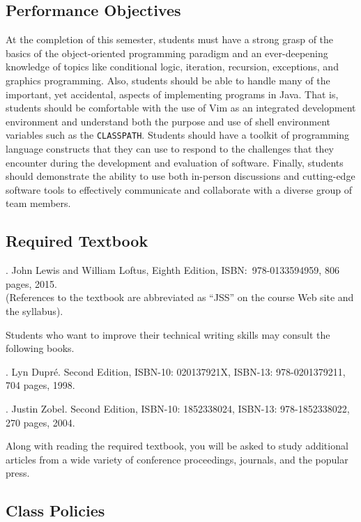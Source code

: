 \subsection*{Performance Objectives}

At the completion of this semester, students must have a strong grasp of the basics of the object-oriented programming
paradigm and an ever-deepening knowledge of topics like conditional logic, iteration, recursion, exceptions, and
graphics programming.  Also, students should be able to handle many of the important, yet accidental, aspects of
implementing programs in Java.  That is, students should be comfortable with the use of Vim as an integrated development
environment and understand both the purpose and use of shell environment variables such as the {\tt CLASSPATH}.
Students should have a toolkit of programming language constructs that they can use to respond to the challenges that
they encounter during the development and evaluation of software. Finally, students should demonstrate the ability to
use both in-person discussions and cutting-edge software tools to effectively communicate and collaborate with a diverse
group of team members.

\subsection*{Required Textbook}

. John Lewis and William Loftus,
Eighth Edition, ISBN:\ 978-0133594959, 806 pages, 2015. \\
(References to the textbook are abbreviated as ``JSS'' on the course Web site and the syllabus).

\noindent
Students who want to improve their technical writing skills may consult the following books.

. Lyn Dupr\'e. Second Edition,  ISBN-10: 020137921X,
ISBN-13: 978-0201379211, 704 pages, 1998.

.  Justin Zobel. Second Edition,  ISBN-10: 1852338024, ISBN-13:
978-1852338022, 270 pages, 2004.

\noindent
Along with reading the required textbook, you will be asked to study additional articles from a wide variety of
conference proceedings, journals, and the popular press.

\subsection*{Class Policies}

